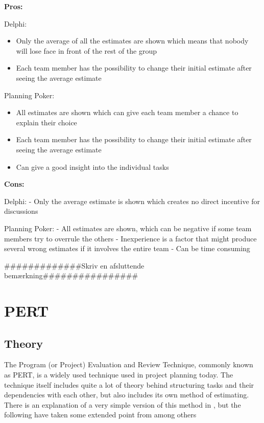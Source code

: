 \textbf{Pros:}

Delphi:
\begin{itemize}
\item Only the average of all the estimates are shown which means that nobody will lose face in front of the rest of the group
\item Each team member has the possibility to change their initial estimate after seeing the average estimate
\end{itemize}

Planning Poker:
\begin{itemize}
\item All estimates are shown which can give each team member a chance to explain their choice
\item Each team member has the possibility to change their initial estimate after seeing the average estimate
\item Can give a good insight into the individual tasks
\end{itemize}



\textbf{Cons:}

Delphi:
- Only the average estimate is shown which creates no direct incentive for discussions

Planning Poker:
- All estimates are shown, which can be negative if some team members try to overrule the others
- Inexperience is a factor that might produce several wrong estimates if it involves the entire team
- Can be time consuming

#############Skriv en afsluttende bemærkning################


\section{PERT}
\subsection{Theory}

The Program (or Project) Evaluation and Review Technique, commonly known as PERT, is a widely used technique used in project planning today. The technique itself includes quite a lot of theory behind structuring tasks and their dependencies with each other, but also includes its own method of estimating. There is an explanation of a very simple version of this method in \cite[p.152]{ProjectManagement_b}, but the following have taken some extended point from \cite{TynerBlain_w} among others\\


